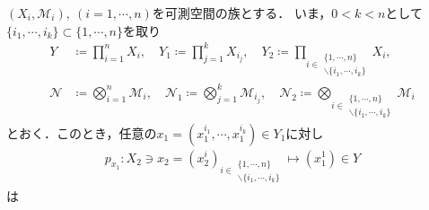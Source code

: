 	$(X_i,\mathscr{M}_i),\ (i=1,\cdots,n)$を可測空間の族とする．
	いま，$0 < k < n$として$\{i_1,\cdots,i_k\} \subset \{1,\cdots,n\}$を取り
	\begin{align}
		Y &\coloneqq \prod_{i=1}^n X_i,
		\quad Y_1 \coloneqq \prod_{j=1}^k X_{i_j},
		\quad Y_2 \coloneqq \prod_{i \in \substack{\{1,\cdots,n\} \\ \backslash \{i_1,\cdots,i_k\}}} X_i, \\
		\mathscr{N} &\coloneqq \bigotimes_{i=1}^n \mathscr{M}_i,
		\quad \mathscr{N}_1 \coloneqq \bigotimes_{j=1}^k \mathscr{M}_{i_j},
		\quad \mathscr{N}_2 \coloneqq \bigotimes_{i \in \substack{\{1,\cdots,n\} \\ \backslash \{i_1,\cdots,i_k\}}} \mathscr{M}_i
	\end{align}
	とおく．このとき，任意の$x_1 = (x_1^{i_1},\cdots,x_1^{i_k}) \in Y_1$に対し
	\begin{align}
		p_{x_1}:X_2 \ni x_2 = (x_2^i)_{i \in \substack{\{1,\cdots,n\} \\ \backslash \{i_1,\cdots,i_k\}}} \longmapsto (x_1^1) \in Y
	\end{align}
	は